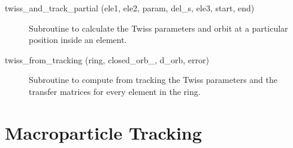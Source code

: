\begin{description}
\item[twiss\_and\_track\_partial (ele1, ele2, param, del\_s, ele3, start, end)] \Newline
Subroutine to calculate the Twiss parameters and orbit at a particular position inside an element. 

\item[twiss\_from\_tracking (ring, closed\_orb\_, d\_orb, error)] \Newline
Subroutine to compute from tracking the Twiss parameters and the transfer matrices 
for every element in the ring. 

\end{description}

\section{Macroparticle Tracking}
\label{r:macro}    

